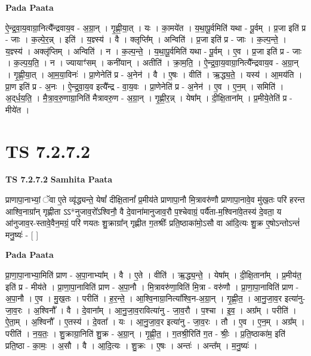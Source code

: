 \documentclass[17pt]{extarticle}
\begin{document}
\textbf{Pada Paata} \newline

ऐ॒न्द्र॒वा॒य॒वाग्रा॒नित्यै᳚न्द्रवाय॒व - अ॒ग्रा॒न् । गृ॒ह्णी॒या॒त् । यः । का॒मये॑त । य॒था॒पू॒र्वमिति॑ यथा - पू॒र्वम् । प्र॒जा इति॑ प्र - जाः । क॒ल्पे॒र॒न्न् । इति॑ । य॒ज्ञ्स्य॑ । वै । क्लृप्ति᳚म् । अन्विति॑ । प्र॒जा इति॑ प्र - जाः । क॒ल्प॒न्ते॒ । य॒ज्ञ्स्य॑ । अक्लृ॑प्तिम् । अन्विति॑ । न । क॒ल्प॒न्ते॒ । य॒था॒पू॒र्वमिति॑ यथा - पू॒र्वम् । ए॒व । प्र॒जा इति॑ प्र - जाः । क॒ल्प॒य॒ति॒ । न । ज्यायाꣳ॑सम् । कनी॑यान् । अतीति॑ । क्रा॒म॒ति॒ । ऐ॒न्द्र॒वा॒य॒वाग्रा॒नित्यै᳚न्द्रवाय॒व - अ॒ग्रा॒न् । गृ॒ह्णी॒या॒त् । आ॒म॒या॒विनः॑ । प्रा॒णेनेति॑ प्र - अ॒नेन॑ । वै । ए॒षः । वीति॑ । ऋ॒द्ध्य॒ते॒ । यस्य॑ । आ॒मय॑ति । प्रा॒ण इति॑ प्र - अ॒नः । ऐ॒न्द्र॒वा॒य॒व इत्यै᳚न्द्र - वा॒य॒वः । प्रा॒णेनेति॑ प्र - अ॒नेन॑ । ए॒व । ए॒न॒म् । समिति॑ । अ॒द्‌र्ध॒य॒ति॒ । मै॒त्रा॒व॒रु॒णाग्रा॒निति॑ मैत्रावरु॒ण - अ॒ग्रा॒न् । गृ॒ह्णी॒र॒न्न् । येषा᳚म् । दी॒क्षि॒ताना᳚म् । प्र॒मीये॒तेति॑ प्र - मीये॑त ।  \newline




\section*{ TS 7.2.7.2 }

\textbf{TS 7.2.7.2 } \newline
\textbf{Samhita Paata} \newline

प्राणापा॒नाभ्यां॒ ॅवा ए॒ते व्यृ॑द्ध्यन्ते॒ येषां᳚ दीक्षि॒तानां᳚ प्र॒मीय॑ते प्राणापा॒नौ मि॒त्रावरु॑णौ प्राणापा॒नावे॒व मु॑ख॒तः परि॑ हरन्त आश्वि॒नाग्रा᳚न् गृह्णीता ऽऽ*नुजाव॒रो᳚ऽश्विनौ॒ वै दे॒वाना॑मानुजाव॒रौ प॒श्चेवाग्रं॒ पर्यै॑ता-म॒श्विना॑वे॒तस्य॑ दे॒वता॒ य आ॑नुजाव॒र-स्तावे॒वैन॒मग्रं॒ परि॑ णयतः शु॒क्राग्रा᳚न् गृह्णीत ग॒तश्रीः᳚ प्रति॒ष्ठाका॑मो॒ऽसौ वा आ॑दि॒त्यः शु॒क्र ए॒षोऽन्तोऽन्तं॑ मनु॒ष्यः॑ - [  ] \newline

\textbf{Pada Paata} \newline

प्रा॒णा॒पा॒नाभ्या॒मिति॑ प्राण - अ॒पा॒नाभ्या᳚म् । वै । ए॒ते । वीति॑ । ऋ॒द्ध्य॒न्ते॒ । येषा᳚म् । दी॒क्षि॒ताना᳚म् । प्र॒मीय॑त॒ इति॑ प्र - मीय॑ते । प्रा॒णा॒पा॒नाविति॑ प्राण - अ॒पा॒नौ । मि॒त्रावरु॑णा॒विति॑ मि॒त्रा - वरु॑णौ । प्रा॒णा॒पा॒नाविति॑ प्राण - अ॒पा॒नौ । ए॒व । मु॒ख॒तः । परीति॑ । ह॒र॒न्ते॒ । आ॒श्वि॒नाग्रा॒नित्या᳚श्वि॒न-अ॒ग्रा॒न् । गृ॒ह्णी॒त॒ । आ॒नु॒जा॒व॒र इत्या॑नु-जा॒व॒रः । अ॒श्विनौ᳚ । वै । दे॒वाना᳚म् । आ॒नु॒जा॒व॒रावित्या॑नु - जा॒व॒रौ । प॒श्चा । इ॒व॒ । अग्र᳚म् । परीति॑ । ऐ॒ता॒म् । अ॒श्विनौ᳚ । ए॒तस्य॑ । दे॒वता᳚ । यः । आ॒नु॒जा॒व॒र इत्या॑नु - जा॒व॒रः । तौ । ए॒व । ए॒न॒म् । अग्र᳚म् । परीति॑ । न॒य॒तः॒ । शु॒क्राग्रा॒निति॑ शु॒क्र - अ॒ग्रा॒न् । गृ॒ह्णी॒त॒ । ग॒तश्री॒रिति॑ ग॒त - श्रीः॒ । प्र॒ति॒ष्ठाका॑म॒ इति॑ प्रति॒ष्ठा - का॒मः॒ । अ॒सौ । वै । आ॒दि॒त्यः । शु॒क्रः । ए॒षः । अन्तः॑ । अन्त᳚म् । म॒नु॒ष्यः॑ ।  \newline
\end{document}

